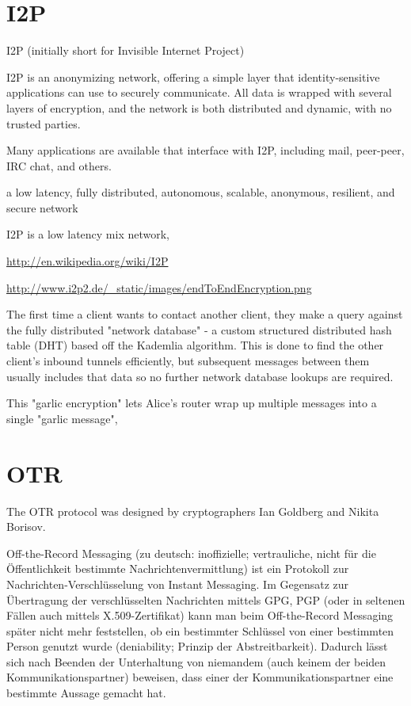 \section{I2P}

I2P (initially short for Invisible Internet Project)

I2P is an anonymizing network, offering a simple layer that identity-sensitive applications can use to securely communicate. All data is wrapped with several layers of encryption, and the network is both distributed and dynamic, with no trusted parties.

Many applications are available that interface with I2P, including mail, peer-peer, IRC chat, and others.


 a low latency, fully distributed, autonomous, scalable, anonymous, resilient, and secure network

  I2P is a low latency mix network, 


\url{http://en.wikipedia.org/wiki/I2P}

\url{http://www.i2p2.de/_static/images/endToEndEncryption.png}

The first time a client wants to contact another client, they make a query against the fully distributed "network database" - a custom structured distributed hash table (DHT) based off the Kademlia algorithm. This is done to find the other client's inbound tunnels efficiently, but subsequent messages between them usually includes that data so no further network database lookups are required.

This "garlic encryption" lets Alice's router wrap up multiple messages into a single "garlic message",




\section{OTR}

The OTR protocol was designed by cryptographers Ian Goldberg and Nikita Borisov.

Off-the-Record Messaging (zu deutsch: inoffizielle; vertrauliche, nicht für die Öffentlichkeit bestimmte Nachrichtenvermittlung) ist ein Protokoll zur Nachrichten-Verschlüsselung von Instant Messaging. Im Gegensatz zur Übertragung der verschlüsselten Nachrichten mittels GPG, PGP (oder in seltenen Fällen auch mittels X.509-Zertifikat) kann man beim Off-the-Record Messaging später nicht mehr feststellen, ob ein bestimmter Schlüssel von einer bestimmten Person genutzt wurde (deniability; Prinzip der Abstreitbarkeit). Dadurch lässt sich nach Beenden der Unterhaltung von niemandem (auch keinem der beiden Kommunikationspartner) beweisen, dass einer der Kommunikationspartner eine bestimmte Aussage gemacht hat.


